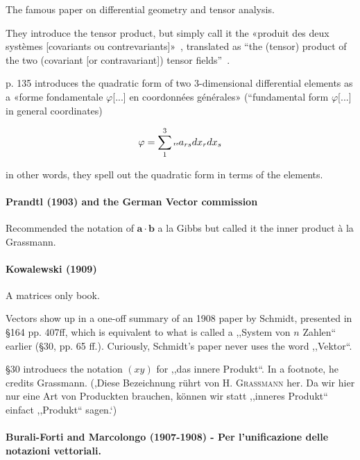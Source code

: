 The famous paper on differential geometry and tensor analysis.

They introduce the tensor product, but simply call it the
«produit des deux systèmes [covariants ou contrevariants]»~\cite[p. 133]{Ricci1900}, translated as
``the (tensor) product of the two (covariant [or contravariant]) tensor fields''~\cite[p. 28]{Hermann1975}.

p. 135 introduces the quadratic form of two 3-dimensional differential elements as a «forme fondamentale $\varphi$[...] en coordonnées générales» (``fundamental form $\varphi$[...] in general coordinates)

\[
\varphi = \sum_1^3 \text{\tiny{rs}} a_{rs} dx_r dx_s
\]

in other words, they spell out the quadratic form in terms of the elements.



\paragraph{Prandtl (1903) and the German Vector commission}

Recommended the notation of $\mathbf{a} \cdot \mathbf{b}$ a la Gibbs but called it the inner product à la Grassmann.



\paragraph{Kowalewski (1909)\cite{Kowalewski1909}}

A matrices only book.

Vectors show up in a one-off summary of an 1908 paper by Schmidt, presented in
\S 164 pp. 407ff, which is equivalent to what is called a ,,System von $n$
Zahlen`` earlier (\S 30, pp. 65 ff.). Curiously, Schmidt's paper never uses the
word ,,Vektor``.

\S 30 introduecs the notation $(xy)$ for ,,das innere Produkt``. In a footnote,
he credits Grassmann. (,Diese Bezeichnung rührt von \textsc{H. Grassmann} her.
Da wir hier nur eine Art von Produckten brauchen, können wir statt ,,inneres
Produkt`` einfact ,,Produkt`` sagen.`)


\paragraph{Burali-Forti and Marcolongo (1907-1908) - Per l’unificazione delle notazioni vettoriali.}

